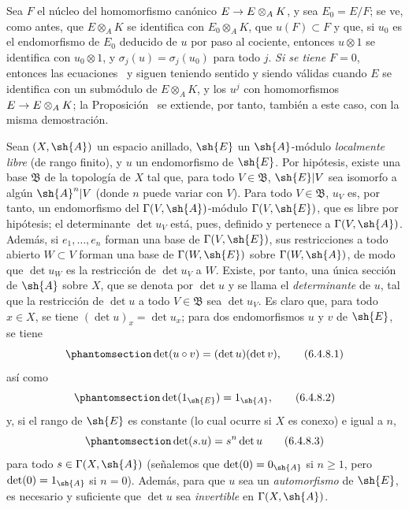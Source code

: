 \documentclass[oneside,10pt]{amsart}
\makeatletter
\renewcommand{\geq}{\geqslant}
\newcommand{\ega@arrow}[2]{\mathchoice{#1}{#2}{#2}{#2}}
\renewcommand{\to}{\ega@arrow{\longrightarrow}{\rightarrow}}
\let\EGAOriginalLabel\label
\renewcommand{\label}[1]{\phantomsection\EGAOriginalLabel{#1}}
\makeatother
\begin{document}
\begin{remark}[6.4.7]
Sea $F$ el núcleo del homomorfismo canónico $E\to E\otimes_A K$, y sea $E_0=E/F$;
se ve, como antes, que $E\otimes_A K$ se identifica con $E_0\otimes_A K$, que $u(F)\subset F$ y que, si $u_0$ es el endomorfismo de $E_0$ deducido de $u$ por paso al cociente, entonces $u\otimes1$ se identifica con $u_0\otimes1$, y $\sigma_j(u)=\sigma_j(u_0)$ para todo $j$.
\emph{Si se tiene $F=0$}, entonces las ecuaciones~ y  siguen teniendo sentido y siendo válidas cuando $E$ se identifica con un submódulo de $E\otimes_A K$, y los $u^j$ con homomorfismos $E\to E\otimes_A K$;
la Proposición~ se extiende, por tanto, también a este caso, con la misma demostración.
\end{remark}

\begin{env}[6.4.8]
\label{II.6.4.8}
Sean $(X,\sh{A})$ un espacio anillado, $\sh{E}$ un $\sh{A}$-módulo \emph{localmente libre} (de rango finito), y $u$ un endomorfismo de $\sh{E}$.
Por hipótesis, existe una base $\mathfrak{B}$ de la topología de $X$ tal que, para todo $V\in\mathfrak{B}$, $\sh{E}|V$ sea isomorfo a algún $\sh{A}^n|V$ (donde $n$ puede variar con $V$).
Para todo $V\in\mathfrak{B}$, $u_V$ es, por tanto, un endomorfismo del $\Gamma(V,\sh{A})$-módulo $\Gamma(V,\sh{E})$, que es libre por hipótesis;
el determinante $\det u_V$ está, pues, definido y pertenece a $\Gamma(V,\sh{A})$.
Además, si $e_1,\ldots,e_n$ forman una base de $\Gamma(V,\sh{E})$, sus restricciones a todo abierto $W\subset V$ forman una base de $\Gamma(W,\sh{E})$ sobre $\Gamma(W,\sh{A})$, de modo que $\det u_W$ es la restricción de $\det u_V$ a $W$.
Existe, por tanto, una única sección de $\sh{A}$ sobre $X$, que se denota por $\det u$ y se llama el \emph{determinante} de $u$, tal que la restricción de $\det u$ a todo $V\in\mathfrak{B}$ sea $\det u_V$.
Es claro que, para todo $x\in X$, se tiene $(\det u)_x=\det u_x$;
para dos endomorfismos $u$ y $v$ de $\sh{E}$, se tiene
\[
\label{II.6.4.8.1}
  \det(u\circ v) = (\det u)(\det v),
\tag{6.4.8.1}
\]
así como
\[
\label{II.6.4.8.2}
  \det(1_{\sh{E}}) = 1_{\sh{A}},
\tag{6.4.8.2}
\]
y, si el rango de $\sh{E}$ es constante (lo cual ocurre  si $X$ es conexo) e igual a $n$,
\[
\label{II.6.4.8.3}
  \det(s.u) = s^n\det u
\tag{6.4.8.3}
\]
para todo $s\in\Gamma(X,\sh{A})$ (señalemos que $\det(0)=0_{\sh{A}}$ si $n\geq1$, pero $\det(0)=1_{\sh{A}}$ si $n=0$).
Además, para que $u$ sea un \emph{automorfismo} de $\sh{E}$, es necesario y suficiente que $\det u$ sea \emph{invertible} en $\Gamma(X,\sh{A})$.


\end{env}
\end{document}
